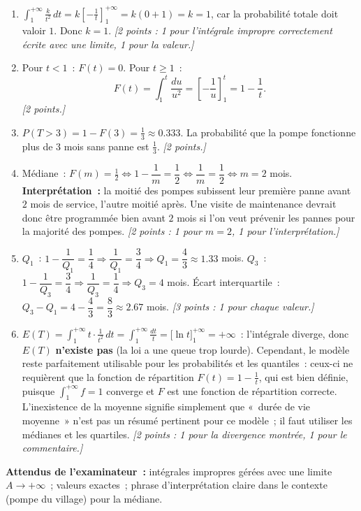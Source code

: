 \documentclass[11pt]{article}
\begin{document}
\begin{corrige}
\begin{enumerate}
\item $\displaystyle\int_1^{+\infty} \frac{k}{t^2}\,dt = k\left[-\frac{1}{t}\right]_1^{+\infty} = k(0 + 1) = k = 1$, car la probabilité totale doit valoir $1$. Donc $k = 1$.
\textit{[2 points : 1 pour l'intégrale impropre correctement écrite avec une limite, 1 pour la valeur.]}
\item Pour $t < 1$~: $F(t) = 0$. Pour $t \geq 1$~:
\[ F(t) = \int_1^t \frac{du}{u^2} = \left[-\frac{1}{u}\right]_1^t = 1 - \frac{1}{t}. \]
\textit{[2 points.]}
\item $\displaystyle P(T > 3) = 1 - F(3) = \frac{1}{3} \approx 0.333.$ La probabilité que la pompe fonctionne plus de $3$ mois sans panne est $\tfrac13$.
\textit{[2 points.]}
\item Médiane~: $F(m) = \tfrac12 \Leftrightarrow 1 - \dfrac{1}{m} = \dfrac12 \Leftrightarrow \dfrac{1}{m} = \dfrac12 \Leftrightarrow m = 2$ mois.
\textbf{Interprétation~:} la moitié des pompes subissent leur première panne avant $2$ mois de service, l'autre moitié après. Une visite de maintenance devrait donc être programmée bien avant $2$ mois si l'on veut prévenir les pannes pour la majorité des pompes.
\textit{[2 points : 1 pour $m=2$, 1 pour l'interprétation.]}
\item $Q_1$~: $1 - \dfrac{1}{Q_1} = \dfrac14 \Rightarrow \dfrac{1}{Q_1} = \dfrac34 \Rightarrow Q_1 = \dfrac{4}{3} \approx 1.33$ mois.
$Q_3$~: $1 - \dfrac{1}{Q_3} = \dfrac34 \Rightarrow \dfrac{1}{Q_3} = \dfrac14 \Rightarrow Q_3 = 4$ mois.
Écart interquartile~: $Q_3 - Q_1 = 4 - \dfrac43 = \dfrac{8}{3} \approx 2.67$ mois.
\textit{[3 points : 1 pour chaque valeur.]}
\item $\displaystyle E(T) = \int_1^{+\infty} t \cdot \frac{1}{t^2}\,dt = \int_1^{+\infty} \frac{dt}{t} = \Big[\ln t\Big]_1^{+\infty} = +\infty$~: l'intégrale diverge, donc $E(T)$ \textbf{n'existe pas} (la loi a une queue trop lourde).
Cependant, le modèle reste parfaitement utilisable pour les probabilités et les quantiles~: ceux-ci ne requièrent que la fonction de répartition $F(t) = 1 - \tfrac1t$, qui est bien définie, puisque $\int_1^{+\infty} f = 1$ converge et $F$ est une fonction de répartition correcte. L'inexistence de la moyenne signifie simplement que «~durée de vie moyenne~» n'est pas un résumé pertinent pour ce modèle~; il faut utiliser les médianes et les quartiles.
\textit{[2 points : 1 pour la divergence montrée, 1 pour le commentaire.]}
\end{enumerate}
\textbf{Attendus de l'examinateur~:} intégrales impropres gérées avec une limite $A \to +\infty$~; valeurs exactes~; phrase d'interprétation claire dans le contexte (pompe du village) pour la médiane.
\end{corrige}
\end{document}
